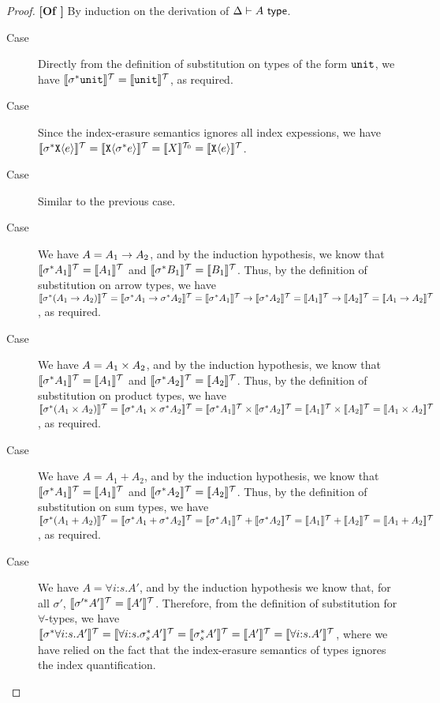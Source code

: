 \begin{proof}\textbf{[Of ]}
  By induction on the derivation of $\Delta \vdash A \isType$.
  \begin{description}
  \item[Case ] Directly from the definition of
    substitution on types of the form $\tyUnit$, we have
    $\tySem{\sigma^*\tyUnit} = \tySem{\tyUnit}$, as required.
  \item[Case ] Since the index-erasure semantics
    ignores all index expessions, we have
    $\tySem{\sigma^*\tyPrim{X}{e}} = \tySem{\tyPrim{X}{\sigma^*e}} =
    \tyPrimSem{X} = \tySem{\tyPrim{X}{e}}$.
  \item[Case ] Similar to the previous case.
  \item[Case ] We have $A = A_1 \tyArr A_2$, and by the
    induction hypothesis, we know that $\tySem{\sigma^*A_1} =
    \tySem{A_1}$ and $\tySem{\sigma^*B_1} = \tySem{B_1}$. Thus, by the
    definition of substitution on arrow types, we have
    $\tySem{\sigma^*(A_1 \tyArr A_2)} = \tySem{\sigma^*A_1 \tyArr
      \sigma^*A_2} = \tySem{\sigma^*A_1} \to \tySem{\sigma^*A_2} =
    \tySem{A_1} \to \tySem{A_2} = \tySem{A_1 \tyArr A_2}$, as
    required.
  \item[Case ] We have $A = A_1 \tyProduct A_2$, and
    by the induction hypothesis, we know that $\tySem{\sigma^*A_1} =
    \tySem{A_1}$ and $\tySem{\sigma^*A_2} = \tySem{A_2}$. Thus, by the
    definition of substitution on product types, we have
    $\tySem{\sigma^*(A_1 \tyProduct A_2)} = \tySem{\sigma^*A_1
      \tyProduct \sigma^*A_2} = \tySem{\sigma^*A_1} \times
    \tySem{\sigma^*A_2} = \tySem{A_1} \times \tySem{A_2} = \tySem{A_1
      \tyProduct A_2}$, as required.
  \item[Case ] We have $A = A_1 + A_2$, and by the
    induction hypothesis, we know that $\tySem{\sigma^*A_1} =
    \tySem{A_1}$ and $\tySem{\sigma^*A_2} = \tySem{A_2}$. Thus, by the
    definition of substitution on sum types, we have
    $\tySem{\sigma^*(A_1 + A_2)} = \tySem{\sigma^*A_1 + \sigma^*A_2} =
    \tySem{\sigma^*A_1} + \tySem{\sigma^*A_2} = \tySem{A_1} +
    \tySem{A_2} = \tySem{A_1 + A_2}$, as required.
  \item[Case ] We have $A = \forall i\mathord:s.A'$,
    and by the induction hypothesis we know that, for all $\sigma'$,
    $\tySem{\sigma'^*A'} = \tySem{A'}$. Therefore, from the definition
    of substitution for $\forall$-types, we have
    $\tySem{\sigma^*\forall i\mathord:s.A'} = \tySem{\forall
      i\mathord:s.\sigma_s^{*}A'} = \tySem{\sigma_s^{*}A'} = \tySem{A'}
    = \tySem{\forall i\mathord:s.A'}$, where we have relied on the
    fact that the index-erasure semantics of types ignores the index
    quantification.
  \end{description}
\end{proof}

